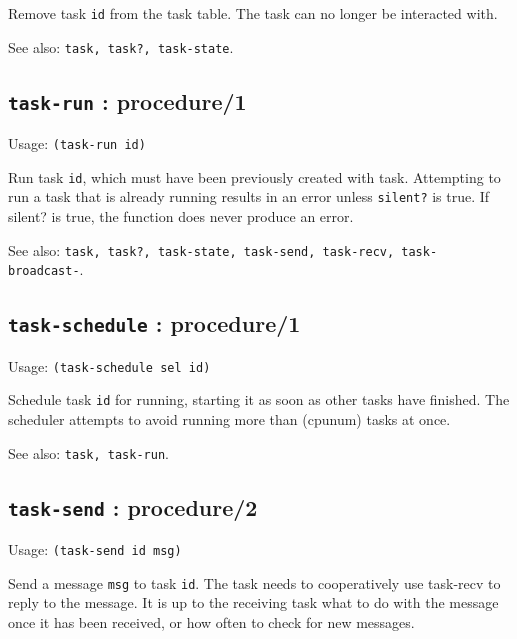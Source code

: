 \documentclass[
]{article}
\newcommand{\passthrough}[1]{#1}
\begin{document}
Remove task \passthrough{\lstinline!id!} from the task table. The task
can no longer be interacted with.

See also: \passthrough{\lstinline!task, task?, task-state!}.

\hypertarget{task-run-procedure1-1}{%
\subsection{\texorpdfstring{\texttt{task-run} :
procedure/1}{task-run : procedure/1}}\label{task-run-procedure1-1}}

Usage: \passthrough{\lstinline!(task-run id)!}

Run task \passthrough{\lstinline!id!}, which must have been previously
created with task. Attempting to run a task that is already running
results in an error unless \passthrough{\lstinline!silent?!} is true. If
silent? is true, the function does never produce an error.

See also:
\passthrough{\lstinline!task, task?, task-state, task-send, task-recv, task-broadcast-!}.

\hypertarget{task-schedule-procedure1-1}{%
\subsection{\texorpdfstring{\texttt{task-schedule} :
procedure/1}{task-schedule : procedure/1}}\label{task-schedule-procedure1-1}}

Usage: \passthrough{\lstinline!(task-schedule sel id)!}

Schedule task \passthrough{\lstinline!id!} for running, starting it as
soon as other tasks have finished. The scheduler attempts to avoid
running more than (cpunum) tasks at once.

See also: \passthrough{\lstinline!task, task-run!}.

\hypertarget{task-send-procedure2-1}{%
\subsection{\texorpdfstring{\texttt{task-send} :
procedure/2}{task-send : procedure/2}}\label{task-send-procedure2-1}}

Usage: \passthrough{\lstinline!(task-send id msg)!}

Send a message \passthrough{\lstinline!msg!} to task
\passthrough{\lstinline!id!}. The task needs to cooperatively use
task-recv to reply to the message. It is up to the receiving task what
to do with the message once it has been received, or how often to check
for new messages.
\end{document}
